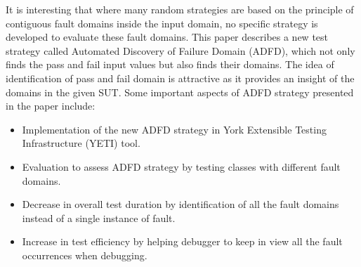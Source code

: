 \documentclass[runningheads,a4paper]{llncs}
\begin{document}


It is interesting that where many random strategies are based on the principle of contiguous fault domains inside the input domain, no specific strategy is developed to evaluate these fault domains. This paper describes a new test strategy called Automated Discovery of Failure Domain (ADFD), which not only finds the pass and fail input values but also finds their domains. The idea of identification of pass and fail domain is attractive as it provides an insight of the domains in the given SUT. Some important aspects of ADFD strategy presented in the paper include:

\begin{itemize}
\item Implementation of the new ADFD strategy in York Extensible Testing Infrastructure (YETI) tool.
\item Evaluation to assess ADFD strategy by testing classes with different fault domains.
\item Decrease in overall test duration by identification of all the fault domains instead of a single instance of fault.
\item Increase in test efficiency by helping debugger to keep in view all the fault occurrences when debugging. 
\end{itemize}
\end{document}
